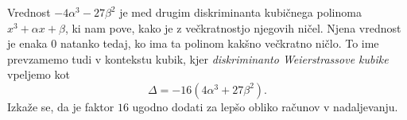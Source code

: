 \documentclass[mat1]{fmfdelo}
\numberwithin{equation}{section}
\theoremstyle{definition}
\begin{document}
\begin{opomba}
    Vrednost $-4\alpha^3 - 27\beta^2$ je med drugim diskriminanta kubičnega polinoma $x^3 + \alpha x + \beta$, ki nam pove, kako je z večkratnostjo njegovih ničel. Njena vrednost je enaka $0$ natanko tedaj, ko ima ta polinom kakšno večkratno ničlo.
    To ime prevzamemo tudi v kontekstu kubik, kjer \emph{diskriminanto Weierstrassove kubike} vpeljemo kot
    \[
        \Delta = -16(4\alpha^3 + 27\beta^2).
    \]
    Izkaže se, da je faktor $16$ ugodno dodati za lepšo obliko računov v nadaljevanju. 

    

\end{opomba}
\end{document}
